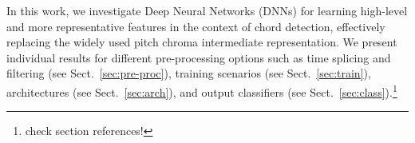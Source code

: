 \documentclass{article}
\begin{document}
In this work, we investigate Deep Neural Networks (DNNs) for learning high-level and more representative features in the context of chord detection, effectively replacing the widely used pitch chroma intermediate representation. 
We present individual results for different pre-processing options such as time splicing and filtering (see Sect.~\ref{sec:pre-proc}), training scenarios (see Sect.~\ref{sec:train}), architectures (see Sect.~\ref{sec:arch}), and output classifiers (see Sect.~\ref{sec:class}).\footnote{check section references!} %

%

\end{document}
